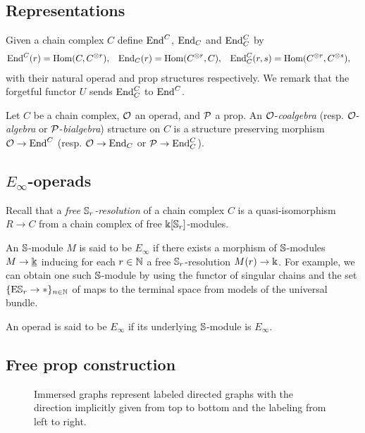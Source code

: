 \subsection{Representations}

Given a chain complex $C$ define $\End^C$, $\End_C$ and $\End_C^C$ by
\begin{align*}
\End^C(r) &= \Hom(C, C^{\otimes r}),
& \End_C(r) &= \Hom(C^{\otimes r}, C),
& \End^C_C(r, s) &= \Hom(C^{\otimes r}, C^{\otimes s}),
\end{align*}
with their natural operad and prop structures respectively.
We remark that the forgetful functor $U$ sends $\End^C_C$ to $\End^C$.

Let $C$ be a chain complex, $\O$ an operad, and $\P$ a prop.
An $\O$-\textit{coalgebra} (resp. $\O$-\textit{algebra} or $\P$-\textit{bialgebra}) structure on $C$ is a structure preserving morphism $\O \to \End^C$ (resp. $\O \to \End_C$ or $\P \to \End_C^C$).

\subsection{\texorpdfstring{$E_\infty$}{E-infty}-operads}

Recall that a \textit{free $\S_r$-resolution} of a chain complex $C$ is a quasi-isomorphism $R \to C$ from a chain complex of free $\k[\S_r]$-modules.

An $\S$-module $M$ is said to be $E_{\infty}$ if there exists a morphism of $\S$-modules $M \to \underline{\k}$ inducing for each $r \in \N$ a free $\S_r$-resolution $M(r) \to \k$.
For example, we can obtain one such $\S$-module by using the functor of singular chains and the set $\{\mathrm{E} \S_r \to \ast\}_{n \in \N}$ of maps to the terminal space from models of the universal bundle.

An operad is said to be $E_{\infty}$ if its underlying $\S$-module is $E_\infty$.

\subsection{Free prop construction} \label{ss:free prop}

\begin{figure}
	
	\caption{Immersed graphs represent labeled directed graphs with the direction implicitly given from top to bottom and the labeling from left to right.}
	\label{f:immersion}
\end{figure}

